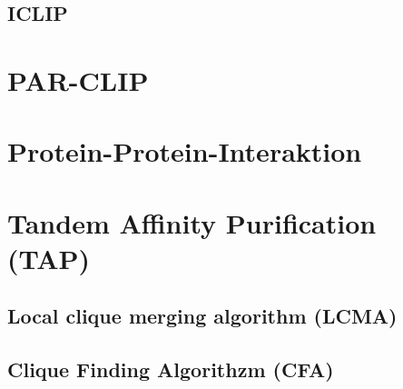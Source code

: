 \documentclass[12pt,a4paper]{article}
\begin{document}
\subsection{ICLIP}

\section{PAR-CLIP}

\section{Protein-Protein-Interaktion}

\section{Tandem Affinity Purification (TAP)}

\subsection{Local clique merging algorithm (LCMA)}

\subsection{Clique Finding Algorithzm (CFA)}



\newpage



\newpage



\newpage



\newpage


\end{document}
